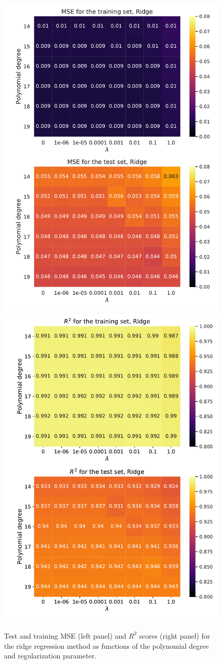 \documentclass[numberedappendix, twocolappendix]{emulateapj}
\begin{document}
\begin{figure}[!htb]
    \centering
    \includegraphics[width=.49\textwidth]{Figures/Ridge_MSE.pdf}
    \includegraphics[width=.49\textwidth]{Figures/Ridge_R2.pdf}
    \caption{Test and training MSE (left panel) and $R^2$ scores (right panel) for the ridge regression method as functions of the polynomial degree and regularization parameter.}
    \label{fig: Ridge scores}
\end{figure}
\end{document}
